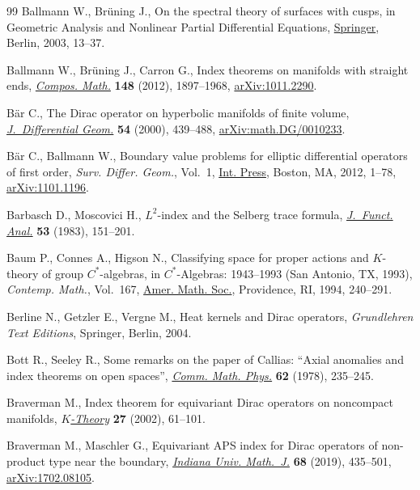 \documentclass[10pt,a4paper]{amsart}
\numberwithin{equation}{section}
\begin{document}
\begin{thebibliography}{99}
Ballmann W., Br\"uning J., On the spectral theory of surfaces with cusps, in
 Geometric Analysis and Nonlinear Partial Differential Equations, \href{https://doi.org/10.1007/978-3-642-55627-2_2}{Springer},
 Berlin, 2003, 13--37.

Ballmann W., Br\"uning J., Carron G., Index theorems on manifolds with straight
 ends, \href{https://doi.org/10.1112/S0010437X12000401}{\textit{Compos. Math.}} \textbf{148} (2012), 1897--1968,
 \href{https://arxiv.org/abs/1011.2290}{arXiv:1011.2290}.

B\"ar C., The {D}irac operator on hyperbolic manifolds of finite volume,
 \href{https://doi.org/10.4310/jdg/1214339790}{\textit{J.~Differential Geom.}} \textbf{54} (2000), 439--488,
 \href{https://arxiv.org/abs/math.DG/0010233}{arXiv:math.DG/0010233}.

B\"ar C., Ballmann W., Boundary value problems for elliptic differential
 operators of first order, \textit{{Surv. Differ. Geom.}}, Vol.~1, \href{https://doi.org/10.4310/SDG.2012.v17.n1.a1}{Int. Press}, Boston, MA, 2012, 1--78,
 \href{https://arxiv.org/abs/1101.1196}{arXiv:1101.1196}.

Barbasch D., Moscovici H., {$L^{2}$}-index and the {S}elberg trace formula,
 \href{https://doi.org/10.1016/0022-1236(83)90050-2}{\textit{J.~Funct. Anal.}} \textbf{53} (1983), 151--201.

Baum P., Connes A., Higson N., Classifying space for proper actions and
 {$K$}-theory of group {$C^\ast$}-algebras, in {$C^\ast$}-Algebras: 1943--1993
 ({S}an {A}ntonio, {TX}, 1993), \textit{Contemp. Math.}, Vol.~167, \href{https://doi.org/10.1090/conm/167/1292018}{Amer. Math.
 Soc.}, Providence, RI, 1994, 240--291.

Berline N., Getzler E., Vergne M., Heat kernels and {D}irac operators,
 \textit{Grundlehren Text Editions}, Springer, Berlin, 2004.

Bott R., Seeley R., Some remarks on the paper of {C}allias: ``{A}xial anomalies
 and index theorems on open spaces'', \href{https://doi.org/10.1007/BF01202526}{\textit{Comm. Math. Phys.}} \textbf{62}
 (1978), 235--245.

Braverman M., Index theorem for equivariant {D}irac operators on noncompact
 manifolds, \href{https://doi.org/10.1023/A:1020842205711}{\textit{$K$-Theory}} \textbf{27} (2002), 61--101.

Braverman M., Maschler G., Equivariant {APS} index for {D}irac operators of
 non-product type near the boundary, \href{https://doi.org/10.1512/iumj.2019.68.7621}{\textit{Indiana Univ. Math.~J.}}
 \textbf{68} (2019), 435--501, \href{https://arxiv.org/abs/1702.08105}{arXiv:1702.08105}.


\end{thebibliography}
\end{document}
